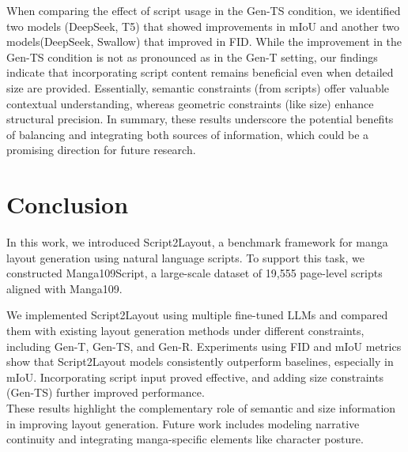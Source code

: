 \documentclass[sigconf, screen, review, anonymous]{acmart}
\begin{document}
When comparing the effect of script usage in the Gen-TS condition, we identified two models (DeepSeek, T5) that showed improvements in mIoU and another two models(DeepSeek, Swallow) that improved in FID. While the improvement in the Gen-TS condition is not as pronounced as in the Gen-T setting, our findings indicate that incorporating script content remains beneficial even when detailed size are provided. Essentially, semantic constraints (from scripts) offer valuable contextual understanding, whereas geometric constraints (like size) enhance structural precision. In summary, these results underscore the potential benefits of balancing and integrating both sources of information, which could be a promising direction for future research.

\section{Conclusion}

In this work, we introduced Script2Layout, a benchmark framework for manga layout generation using natural language scripts. To support this task, we constructed Manga109Script, a large-scale dataset of 19,555 page-level scripts aligned with Manga109.

We implemented Script2Layout using multiple fine-tuned LLMs and compared them with existing layout generation methods under different constraints, including Gen-T, Gen-TS, and Gen-R. Experiments using FID and mIoU metrics show that Script2Layout models consistently outperform baselines, especially in mIoU. Incorporating script input proved effective, and adding size constraints (Gen-TS) further improved performance. \\

These results highlight the complementary role of semantic and size information in improving layout generation. Future work includes modeling narrative continuity and integrating manga-specific elements like character posture.









\end{document}

